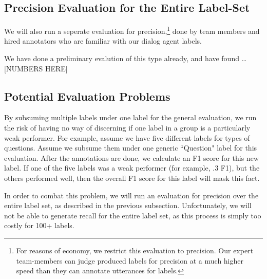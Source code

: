 \subsection{Precision Evaluation for the Entire Label-Set}
We will also run a seperate evaluation for precision,\footnote{For reasons of economy, we restrict this evaluation to precision. Our expert team-members can judge produced labels for precision at a much higher speed than they can annotate utterances for labels.} done by team members and hired annotators who are familiar with our dialog agent labels.

We have done a preliminary evalution of this type already, and have found \ldots [NUMBERS HERE]

\subsection{Potential Evaluation Problems}
By subsuming multiple labels under one label for the general evaluation, we run the risk of having no way of discerning if one label in a group is a particularly weak performer. For example, assume we have five different labels for types of questions. Assume we subsume them under one generic ``Question" label for this evaluation. After the annotations are done, we calculate an F1 score for this new label. If one of the five labels was a weak performer (for example, .3 F1), but the others performed well, then the overall F1 score for this label will mask this fact. 

In order to combat this problem, we will run an evaluation for precision over the entire label set, as described in the previous subsection. Unfortunately, we will not be able to generate recall for the entire label set, as this process is simply too costly for 100+ labels.
